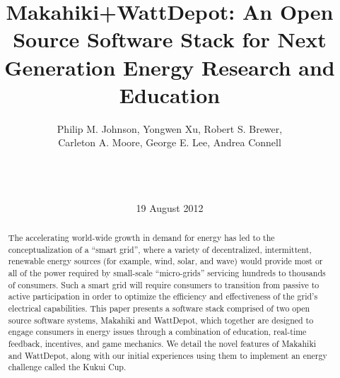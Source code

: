 \documentclass{ict4s_proc_article}
\begin{document}
\title{Makahiki+WattDepot: An Open Source Software Stack for 
Next Generation Energy Research and Education}

%
%


\author{
%
 Philip M. Johnson, 
 Yongwen Xu,
 Robert S. Brewer,\\
 Carleton A. Moore,
 George E. Lee,
 Andrea Connell \\
 \\ %
       \\
\\
}

\date{19 August 2012}


\maketitle
\begin{abstract}
The accelerating world-wide growth in demand for energy has led to the conceptualization
of a ``smart grid'', where a variety of decentralized, intermittent, renewable energy
sources (for example, wind, solar, and wave) would provide most or all of the power
required by small-scale ``micro-grids'' servicing hundreds to thousands of consumers. Such
a smart grid will require consumers to transition from passive to active participation in
order to optimize the efficiency and effectiveness of the grid's electrical capabilities. 
This paper presents a software stack comprised of two open source software systems,
Makahiki and WattDepot, which together are designed to engage consumers in energy issues
through a combination of education, real-time feedback, incentives, and game mechanics. We
detail the novel features of Makahiki and WattDepot, along with our initial experiences using
them to implement an energy challenge called the Kukui Cup.

\end{abstract}
\end{document}

